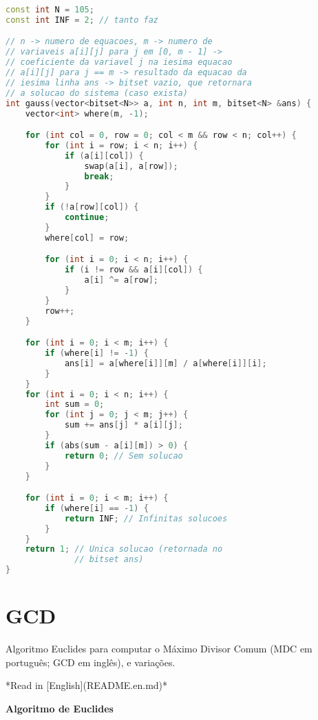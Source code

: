 \documentclass[11pt, a4paper, oneside]{book}
\begin{document}
\begin{multicols}{2}
\begin{lstlisting}[language=C++]
const int N = 105;
const int INF = 2; // tanto faz

// n -> numero de equacoes, m -> numero de
// variaveis a[i][j] para j em [0, m - 1] ->
// coeficiente da variavel j na iesima equacao
// a[i][j] para j == m -> resultado da equacao da
// iesima linha ans -> bitset vazio, que retornara
// a solucao do sistema (caso exista)
int gauss(vector<bitset<N>> a, int n, int m, bitset<N> &ans) {
    vector<int> where(m, -1);

    for (int col = 0, row = 0; col < m && row < n; col++) {
        for (int i = row; i < n; i++) {
            if (a[i][col]) {
                swap(a[i], a[row]);
                break;
            }
        }
        if (!a[row][col]) {
            continue;
        }
        where[col] = row;

        for (int i = 0; i < n; i++) {
            if (i != row && a[i][col]) {
                a[i] ^= a[row];
            }
        }
        row++;
    }

    for (int i = 0; i < m; i++) {
        if (where[i] != -1) {
            ans[i] = a[where[i]][m] / a[where[i]][i];
        }
    }
    for (int i = 0; i < n; i++) {
        int sum = 0;
        for (int j = 0; j < m; j++) {
            sum += ans[j] * a[i][j];
        }
        if (abs(sum - a[i][m]) > 0) {
            return 0; // Sem solucao
        }
    }

    for (int i = 0; i < m; i++) {
        if (where[i] == -1) {
            return INF; // Infinitas solucoes
        }
    }
    return 1; // Unica solucao (retornada no
              // bitset ans)
}
\end{lstlisting}
\end{multicols}

\hfill

\section{GCD}


Algoritmo Euclides para computar o Máximo Divisor Comum (MDC em português; GCD em inglês), e variações.



*Read in [English](README.en.md)*



\textbf{Algoritmo de Euclides} 
\end{document}
